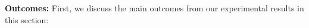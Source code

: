 



\textbf{Outcomes:} First, we discuss the main outcomes from our experimental results in this section:

